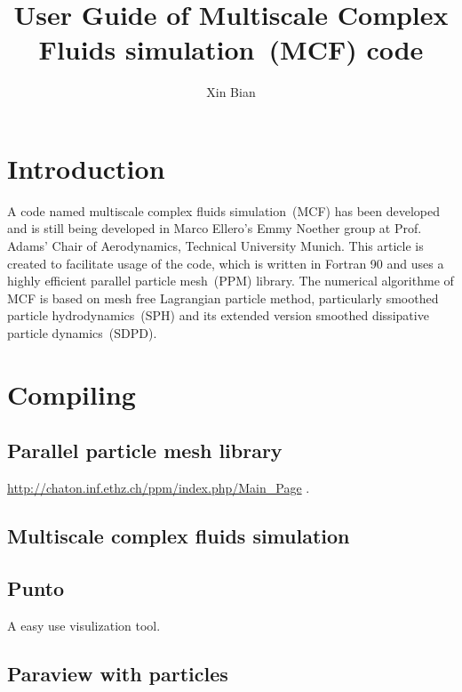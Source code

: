 \documentclass[a4paper,10pt]{article}
\title{User Guide of Multiscale Complex Fluids simulation~(MCF) code}
\author{Xin Bian}
\begin{document}
\maketitle

\tableofcontents

\begin{abstract}
\end{abstract}

\section{Introduction}
A code named multiscale complex fluids simulation~(MCF)
has been developed and is still being developed in
Marco Ellero's Emmy Noether group
at Prof. Adams' Chair of Aerodynamics,
Technical University Munich.
This article is created
to facilitate usage of the code,
which is written in Fortran 90 and
uses a highly efficient parallel particle mesh~(PPM)\cite{Sbalzarini2006} library.
The numerical algorithme of MCF is based on
mesh free Lagrangian particle method,
particularly smoothed particle hydrodynamics~(SPH)
and its extended version smoothed dissipative particle dynamics~(SDPD).

\section{Compiling}

\subsection{Parallel particle mesh library}
\url{http://chaton.inf.ethz.ch/ppm/index.php/Main_Page}
\cite{Sbalzarini2006}.
\subsection{Multiscale complex fluids simulation}

\subsection{Punto}
A easy use visulization tool.

\subsection{Paraview with particles}
\end{document}
